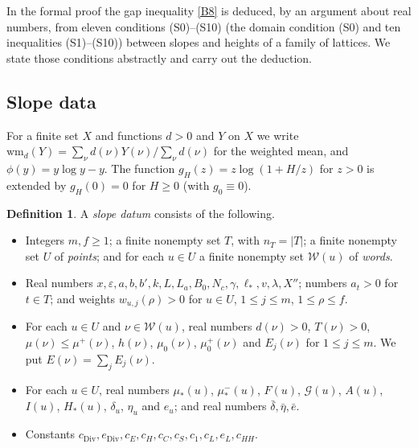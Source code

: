 \documentclass[11pt]{amsart}
\newcommand{\eps}{\varepsilon}
\theoremstyle{plain}
\theoremstyle{definition}
\newtheorem{definition}[theorem]{Definition}
\numberwithin{equation}{section}
\begin{document}
In the formal proof the gap inequality \ref{B8} is deduced, by an argument about real numbers,
from eleven conditions (S0)--(S10) (the domain condition (S0) and ten inequalities (S1)--(S10))
between slopes and heights of a family of lattices. We state those conditions abstractly and
carry out the deduction.

\subsection{Slope data}

For a finite set $X$ and functions $d>0$ and $Y$ on $X$ we write
$\mathrm{wm}_d(Y)=\sum_{\nu}d(\nu)Y(\nu)/\sum_\nu d(\nu)$ for the weighted mean, and
$\phi(y)=y\log y-y$. The function $g_H(z)=z\log(1+H/z)$ for $z>0$ is extended by $g_H(0)=0$
for $H\ge0$ (with $g_0\equiv0$).

\begin{definition}\label{def:slopedatum}
A \emph{slope datum} consists of the following.
\begin{itemize}
\item Integers $m,f\ge1$; a finite nonempty set $T$, with $n_T=|T|$; a finite nonempty set $U$ of
  \emph{points}; and for each $u\in U$ a finite nonempty set $\mathcal W(u)$ of \emph{words}.
\item Real numbers $x,\eps,a,b,b',k,L,L_a,B_0,N_c,\gamma,\ell_\ast,v,\lambda,X''$; numbers $a_t>0$ for
  $t\in T$; and weights $w_{u,j}(\rho)>0$ for $u\in U$, $1\le j\le m$, $1\le\rho\le f$.
\item For each $u\in U$ and $\nu\in\mathcal W(u)$, real numbers $d(\nu)>0$, $T(\nu)>0$,
  $\mu(\nu)\le\mu^+(\nu)$, $h(\nu)$, $\mu_0(\nu)$, $\mu_0^+(\nu)$ and $E_j(\nu)$ for $1\le j\le m$. We
  put $E(\nu)=\sum_jE_j(\nu)$.
\item For each $u\in U$, real numbers $\mu_\ast(u)$, $\mu_\ast^-(u)$, $F(u)$, $\mathcal G(u)$, $A(u)$,
  $I(u)$, $H_\ast(u)$, $\delta_u$, $\eta_u$ and $e_u$; and real numbers $\bar\delta,\bar\eta,\bar e$.
\item Constants $c_{\mathrm{Div}},e_{\mathrm{Div}},c_E,c_H,c_C,c_S,c_1,c_L,e_L,c_{HH}$.
\end{itemize}
\end{definition}
\end{document}
